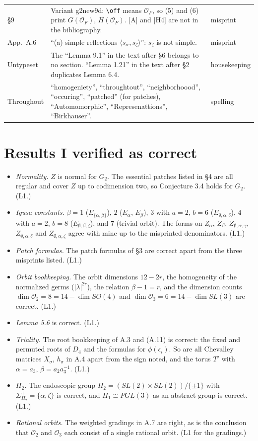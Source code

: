 \documentclass[12pt,letterpaper]{article}
\newcommand{\OF}{\mathcal{O}_F}
\newcommand{\cO}{\mathcal{O}}
\newcommand{\Lv}[1]{\textsf{L#1}}
\theoremstyle{definition}
\begin{document}
\begin{longtable}{p{}p{}p{}}
\S9 & Variant g2new9d: \verb|\off| means $\OF$, so (5) and (6) print $G(\OF)$, $H(\OF)$. [A] and [H4] are not in the bibliography. & misprint\\
App.\ A.6 & ``(a) simple reflections $\langle s_\alpha,s_\zeta\rangle$'': $s_\zeta$ is not simple. & misprint\\
Untypeset & The ``Lemma 9.1'' in the text after \S6 belongs to no section. ``Lemma 1.21'' in the text after \S2 duplicates Lemma 6.4. & housekeeping\\
Throughout & ``homogeniety'', ``throughtout'', ``neighborhoood'', ``occuring'', ``patched'' (for patches), ``Automomorphic'', ``Represenattions'', ``Birkhauser''. & spelling\\
\bottomrule
\end{longtable}

\section{Results I verified as correct}\label{sec:correct}

\begin{itemize}
\item \emph{Normality.} $Z$ is normal for $G_2$. The essential patches listed
in \S4 are all regular and cover $Z$ up to codimension two, so Conjecture 3.4
holds for $G_2$. (\Lv{1}.)
\item \emph{Igusa constants.} $\beta=1$ ($E_{\{\alpha,\beta\}}$), $2$ ($E_\alpha$,
$E_\beta$), $3$ with $a=2$, $b=6$ ($E_{\emptyset,\alpha,\delta}$), $4$ with
$a=2$, $b=8$ ($E_{\emptyset,\beta,\zeta}$), and $7$ (trivial orbit). The forms
on $Z_\alpha$, $Z_\beta$, $Z_{\emptyset,\alpha,\gamma}$,
$Z_{\emptyset,\alpha,\delta}$ and $Z_{\emptyset,\alpha,\zeta}$ agree with mine
up to the misprinted denominators. (\Lv{1}.)
\item \emph{Patch formulas.} The patch formulas of \S3 are correct apart from
the three misprints listed. (\Lv{1}.)
\item \emph{Orbit bookkeeping.} The orbit dimensions $12-2r$, the homogeneity
of the normalized germs ($|\lambda|^{2r}$), the relation $\beta-1=r$, and the
dimension counts $\dim\cO_2=8=14-\dim SO(4)$ and $\dim\cO_3=6=14-\dim SL(3)$
are correct. (\Lv{1}.)
\item \emph{Lemma 5.6} is correct. (\Lv{1}.)
\item \emph{Triality.} The root bookkeeping of A.3 and (A.11) is correct: the
fixed and permuted roots of $D_4$ and the formulas for $\phi(\epsilon_i)$. So
are all Chevalley matrices $X_\sigma$, $h_\sigma$ in A.4 apart from the sign
noted, and the torus $T'$ with $\alpha=a_3$, $\beta=a_2a_3^{-1}$. (\Lv{1}.)
\item \emph{$H_2$.} The endoscopic group $H_2=(SL(2)\times SL(2))/\{\pm1\}$
with $\Sigma_{H_2}^+=\{\alpha,\zeta\}$ is correct, and $H_1\cong PGL(3)$ as an
abstract group is correct. (\Lv{1}.)
\item \emph{Rational orbits.} The weighted gradings in A.7 are right, as is
the conclusion that $\cO_2$ and $\cO_3$ each consist of a single rational
orbit. (\Lv{1} for the gradings.)
\end{itemize}
\end{document}
